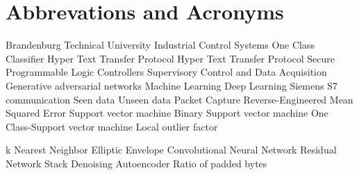 %
%
%
%
\cleardoublepage
\chapter*{Abbrevations and Acronyms}

\begin{acronym}[AAAAAAA]	
	
	\setlength{\itemsep}{.7\parsep}
	
	 {Brandenburg Technical University}
     {Industrial Control Systems}
     {One Class Classifier}
     {Hyper Text Transfer Protocol}
     {Hyper Text Transfer Protocol Secure}
     {Programmable Logic Controllers}
     {Supervisory Control and Data Acquisition}
     {Generative adversarial networks}
     {Machine Learning}
     {Deep Learning}
     {Siemens S7 communication}
     {Seen data}
     {Unseen data}
     {Packet Capture}
     {Reverse-Engineered}
     {Mean Squared Error}
     {Support vector machine}
     {Binary Support vector machine}
     {One Class-Support vector machine}
     {Local outlier factor}
  
     {k Nearest Neighbor}
     {Elliptic Envelope}
     {Convolutional Neural Network}
     {Residual Network}
     {Stack Denoising Autoencoder}
     {Ratio of padded bytes}
    
\end{acronym}
